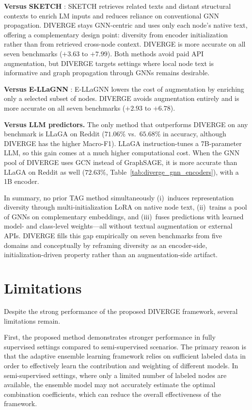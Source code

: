 \documentclass[a4paper,fleqn]{cas-sc}
\newcommand{\revthree}[1]{\textcolor{revgreen}{#1}} %
\DeclareRobustCommand{\revcommon}[2][]{\textcolor{revshared}{#2}} %
\begin{document}
\textbf{Versus SKETCH} \citep{zhou-etal-2025sketch}: SKETCH retrieves related texts and distant structural contexts to enrich LM inputs and reduces reliance on conventional GNN propagation. DIVERGE stays GNN-centric and uses only each node's native text, offering a complementary design point: diversity from encoder initialization rather than from retrieved cross-node context. \revcommon[R2,R4]{DIVERGE is more accurate on all seven benchmarks ($+3.63$ to $+7.99$).} Both methods avoid paid API augmentation, but DIVERGE targets settings where local node text is informative and graph propagation through GNNs remains desirable.

\revcommon[R2,R4]{\textbf{Versus E-LLaGNN} \citep{Jaiswal2024AllAgainstSome}: E-LLaGNN lowers the cost of augmentation by enriching only a selected subset of nodes. DIVERGE avoids augmentation entirely and is more accurate on all seven benchmarks ($+2.93$ to $+6.78$).}

\revcommon[R2,R4]{\textbf{Versus LLM predictors.} The only method that outperforms DIVERGE on any benchmark is LLaGA \citep{Chen2024LLaGA} on Reddit ($71.06\%$ vs.\ $65.68\%$ in accuracy, although DIVERGE has the higher Macro-F1). LLaGA instruction-tunes a 7B-parameter LLM, so this gain comes at a much higher computational cost. When the GNN pool of DIVERGE uses GCN instead of GraphSAGE, it is more accurate than LLaGA on Reddit as well ($72.63\%$, Table~\ref{tab:diverge_gnn_encoders}), with a 1B encoder.}

In summary, no prior TAG method simultaneously (i)~induces representation diversity through multi-initialization LoRA on native node text, (ii)~trains a pool of GNNs on complementary embeddings, and (iii)~fuses predictions with learned model- and class-level weights---all without textual augmentation or external APIs. DIVERGE fills this gap empirically on \revthree{seven benchmarks from five domains} and conceptually by reframing diversity as an encoder-side, initialization-driven property rather than an augmentation-side artifact.


\section{Limitations}\label{sec:Limitations}

Despite the strong performance of the proposed DIVERGE framework, several limitations remain.

First, the proposed method demonstrates stronger performance in fully supervised settings compared to semi-supervised scenarios. The primary reason is that the adaptive ensemble learning framework relies on sufficient labeled data in order to effectively learn the contribution and weighting of different models. In semi-supervised settings, where only a limited number of labeled nodes are available, the ensemble model may not accurately estimate the optimal combination coefficients, which can reduce the overall effectiveness of the framework.
\end{document}
